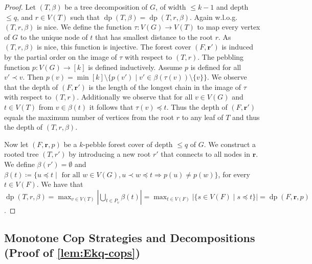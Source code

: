 \documentclass[a4paper,UKenglish,cleveref, autoref, thm-restate]{lipics-v2021}
\DeclareMathOperator{\dep}{dp}
\renewcommand{\vec}[1]{\ensuremath{\boldsymbol{#1}}}
\begin{document}
\begin{proof}
	Let $(T,\beta)$ be a tree decomposition of $G$, of width $\leq k-1$ and depth $\leq q$, and $r\in V(T)$ such that $\dep(T,\beta) = \dep(T,r,\beta)$.
	Again w.l.o.g. $(T,r,\beta)$ is nice.
	We define the function $\tau\colon V(G) \rightarrow V(T)$ to map every vertex of $G$ to the unique node of $t$ that has smallest distance to the root $r$.
	As $(T,r,\beta)$ is nice, this function is injective.
	The forest cover $(F,\vec{r}')$ is induced by the partial order on the image of $\tau$ with respect to $(T,r)$.
	The pebbling function $p\colon V(G) \rightarrow [k]$ is defined inductively.
	Assume $p$ is defined for all $v'\prec v$.
	Then $p(v)=\min [k]\setminus \{ p(v')\mid v'\in \beta(\tau(v))\setminus\{v\}\}$.
	We observe that the depth of $(F,\vec{r}')$ is the length of the longest chain in the image of $\tau$ with respect to $(T,r)$.
	Additionally we observe that for all $v\in V(G)$ and $t\in V(T)$ from $v\in\beta(t)$ it follows that $\tau(v)\preceq t$.
	Thus the depth of $(F,\vec{r}')$ equals the maximum number of vertices from the root $r$ to any leaf of $T$ and thus the depth of $(T,r,\beta)$.
	
	Now let $(F, \vec{r},p)$ be a $k$-pebble forest cover of depth $\leq q$ of $G$.
	We construct a rooted tree $(T,r')$ by introducing a new root $r'$ that connects to all nodes in $\vec{r}$.
	We define $\beta(r')=\emptyset$ and $\beta(t)\coloneqq \{u\preceq t\mid \text{ for all } w\in V(G), u\prec w\preceq t \Rightarrow p(u)\neq p(w) \}$, for every $t\in V(F)$.
	We have that $\dep(T,r,\beta)= \max_{v \in V(T)} \left| \bigcup_{t\in P_v} \beta(t) \right| = \max_{t\in V(F)}|\{s\in V(F)\mid s\preceq t \}|=\dep(F,\vec{r},p)$.
\end{proof}


\subsection{Monotone Cop Strategies and Decompositions (Proof of \cref{lem:Ekq-cops})}
\label{app:cr-equiv}

\crGame*
\end{document}
